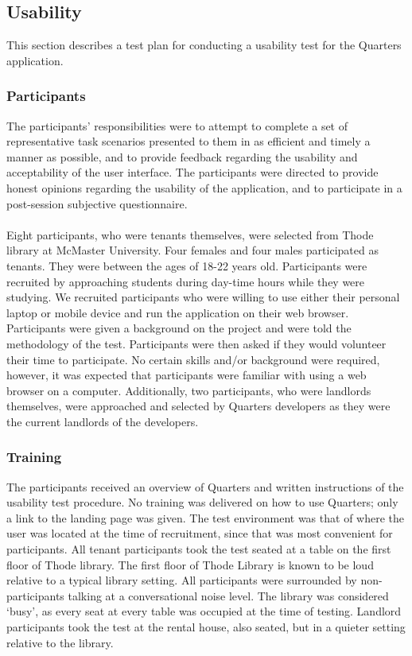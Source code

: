 \documentclass[12pt]{article}
\begin{document}
\subsection{Usability}
This section describes a test plan for conducting a usability test for the Quarters application. 

\subsubsection{Participants}
The participants' responsibilities were to attempt to complete a set of representative task scenarios presented to them in as efficient and timely a manner as possible, and to provide feedback regarding the usability and acceptability of the user interface.  The participants were directed to provide honest opinions regarding the usability of the application, and to participate in a post-session subjective questionnaire.\\ \\
Eight participants, who were tenants themselves, were selected from Thode library at McMaster University. Four females and four males participated as tenants. They were between the ages of 18-22 years old. Participants were recruited by approaching students during day-time hours while they were studying. We recruited participants who were willing to use either their personal laptop or mobile device and run the application on their web browser. Participants were given a background on the project and were told the methodology of the test. Participants were then asked if they would volunteer their time to participate. No certain skills and/or background were required, however, it was expected that participants were familiar with using a web browser on a computer. Additionally, two participants, who were landlords themselves, were approached and selected by Quarters developers as they were the current landlords of the developers.

\subsubsection{Training}
The participants received an overview of Quarters and written instructions of the usability test procedure. No training was delivered on how to use Quarters; only a link to the landing page was given. The test environment was that of where the user was located at the time of recruitment, since that was most convenient for participants. All tenant participants took the test seated at a table on the first floor of Thode library. The first floor of Thode Library is known to be loud relative to a typical library setting. All participants were surrounded by non-participants talking at a conversational noise level. The library was considered ‘busy’, as every seat at every table was occupied at the time of testing. Landlord participants took the test at the rental house, also seated, but in a quieter setting relative to the library.
\end{document}
